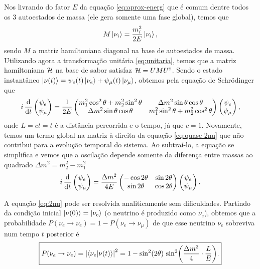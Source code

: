 \documentclass[12pt]{report}
\begin{document}
Nos livrando do fator $E$ da equação \ref{eq:aprox-energ} que é comum dentre todos os 3 autoestados de massa (ele gera somente uma fase global), temos que
\begin{equation} \label{eq:mass-eigen}
M \ket{\nu_i} = \frac{m_i^2}{2E} \ket{\nu_i},
\end{equation}
sendo $M$ a matriz hamiltoniana diagonal na base de autoestados de massa. Utilizando agora a transformação unitária \ref{eq:unitaria}, temos que a matriz hamiltoniana $\mathcal{H}$ na base de sabor satisfaz $\mathcal{H} = U M U^\dagger$. Sendo o estado instantâneo $\ket{\nu(t)} = \psi_e(t) \ket{\nu_e} + \psi_\mu(t) \ket{\nu_\mu}$, obtemos pela equação de Schrödinger que
\begin{equation} \label{eq:quase-2nu}
i \, \dv{t}
\begin{pmatrix}
\psi_e \\ \psi_\mu
\end{pmatrix} = \frac{1}{2E}
\begin{pmatrix}
m_1^2 \cos^2\theta + m_2^2 \sin^2 \theta & \Delta m^2 \sin\theta \cos\theta \\
\Delta m^2 \sin\theta \cos\theta & m_1^2 \sin^2\theta + m_2^2 \cos^2\theta
\end{pmatrix}
\begin{pmatrix}
\psi_e \\ \psi_\mu
\end{pmatrix},
\end{equation}
onde $L = ct = t$ é a distância percorrida e o tempo, já que $c = 1$. Novamente, temos um termo global na matriz à direita da equação \ref{eq:quase-2nu} que não contribui para a evolução temporal do sistema. Ao subtraí-lo, a equação se simplifica e vemos que a oscilação depende somente da diferença entre massas ao quadrado $\Delta m^2 = m_2^2 - m_1^2$
\begin{equation} \label{eq:2nu}
i \, \dv{t}
\begin{pmatrix}
\psi_e \\ \psi_\mu
\end{pmatrix} = \frac{\Delta m^2}{4E}
\begin{pmatrix}
-\cos2\theta & \sin2\theta \\
\sin2\theta & \cos2\theta
\end{pmatrix}
\begin{pmatrix}
\psi_e \\ \psi_\mu
\end{pmatrix}.
\end{equation}

A equação \ref{eq:2nu} pode ser resolvida analiticamente sem dificuldades. Partindo da condição inicial $\ket{\nu(0)} = \ket{\nu_e}$ (o neutrino é produzido como $\nu_e$), obtemos que a probabilidade $P(\nu_e \to \nu_e) = 1 - P(\nu_e \to \nu_\mu)$ de que esse neutrino $\nu_e$ sobreviva num tempo $t$ posterior é
\begin{equation} \label{eq:sobrev-2nu}
\boxed{
P(\nu_e \to \nu_e) = \abs{\braket{\nu_e}{\nu(t)}}^2 =
1 - \sin[2](2 \theta) \, \sin[2](\frac{\Delta m^2}{4} \cdot \frac{L}{E}). }
\end{equation}
\end{document}

